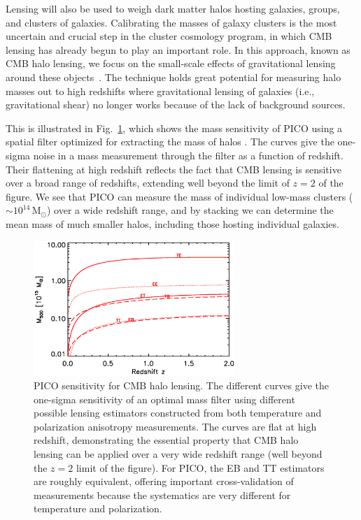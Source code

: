 \documentclass[PICOReport.tex]{subfiles}
\begin{document}

Lensing will also be used to weigh dark matter halos hosting galaxies, groups, and clusters of galaxies.  Calibrating the masses of galaxy clusters is the most uncertain and crucial step in the cluster cosmology program, in which CMB lensing has already begun to play an important role.  In this approach, known as CMB halo lensing, we focus on the small-scale effects of gravitational lensing around these objects~\citep{2015ApJ...806..247B, 2015PhRvL.114o1302M, 2016A&A...594A..24P}. The technique holds great potential for measuring halo masses out to high redshifts where gravitational lensing of galaxies (i.e., gravitational shear) no longer works because of the lack of background sources.

This is illustrated in Fig.~\ref{fig:HaloLensing}, which shows the mass sensitivity of PICO using a spatial filter optimized for extracting the mass of halos \citep{2015A&A...578A..21M}.  The curves give the one-sigma noise in a mass measurement through the filter as a function of redshift.  Their flattening at high redshift reflects the fact that CMB lensing is sensitive over a broad range of redshifts, extending well beyond the limit of $z=2$ of the figure.  We see that PICO can measure the mass of individual low-mass clusters ($\sim 10^{14}$\,M$_\odot$) over a wide redshift range, and by stacking we can determine the mean mass of much smaller halos, including those hosting individual galaxies.  
\begin{figure}
\hspace{-0.1in}
\parbox{3.1in}{\centerline {
\includegraphics[width=3.0in]{images/m500lim_vs_z_pico_polar_v1.eps} } }
\hspace{0.in}
\parbox{3.4in}{
\caption{ \label{fig:HaloLensing} PICO sensitivity for CMB halo lensing.  The different curves give the one-sigma sensitivity of an optimal mass filter \citep{2015A&A...578A..21M} using different possible lensing estimators constructed from both temperature and polarization anisotropy measurements.  The curves are flat at high redshift, demonstrating the essential property that CMB halo lensing can be applied over a very wide redshift range (well beyond the $z=2$ limit of the figure).  For PICO, the EB and TT estimators are roughly equivalent, offering important cross-validation of measurements because the systematics are very different for temperature and polarization. } }
\vspace{-0.1in}
\end{figure}
\end{document}
